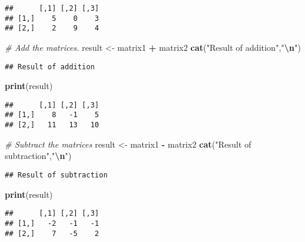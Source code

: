 \documentclass[
]{article}
\newenvironment{Shaded}{\begin{snugshade}}{\end{snugshade}}
\newcommand{\CommentTok}[1]{\textcolor[rgb]{0.56,0.35,0.01}{\textit{#1}}}
\newcommand{\FunctionTok}[1]{\textcolor[rgb]{0.13,0.29,0.53}{\textbf{#1}}}
\newcommand{\NormalTok}[1]{#1}
\newcommand{\OtherTok}[1]{\textcolor[rgb]{0.56,0.35,0.01}{#1}}
\newcommand{\SpecialCharTok}[1]{\textcolor[rgb]{0.81,0.36,0.00}{\textbf{#1}}}
\newcommand{\StringTok}[1]{\textcolor[rgb]{0.31,0.60,0.02}{#1}}
\begin{document}
\begin{verbatim}
##      [,1] [,2] [,3]
## [1,]    5    0    3
## [2,]    2    9    4
\end{verbatim}

\begin{Shaded}
\begin{Highlighting}[]
\CommentTok{\# Add the matrices.}
\NormalTok{result }\OtherTok{\textless{}{-}}\NormalTok{ matrix1 }\SpecialCharTok{+}\NormalTok{ matrix2}
\FunctionTok{cat}\NormalTok{(}\StringTok{"Result of addition"}\NormalTok{,}\StringTok{"}\SpecialCharTok{\textbackslash{}n}\StringTok{"}\NormalTok{)}
\end{Highlighting}
\end{Shaded}

\begin{verbatim}
## Result of addition
\end{verbatim}

\begin{Shaded}
\begin{Highlighting}[]
\FunctionTok{print}\NormalTok{(result)}
\end{Highlighting}
\end{Shaded}

\begin{verbatim}
##      [,1] [,2] [,3]
## [1,]    8   -1    5
## [2,]   11   13   10
\end{verbatim}

\begin{Shaded}
\begin{Highlighting}[]
\CommentTok{\# Subtract the matrices}
\NormalTok{result }\OtherTok{\textless{}{-}}\NormalTok{ matrix1 }\SpecialCharTok{{-}}\NormalTok{ matrix2}
\FunctionTok{cat}\NormalTok{(}\StringTok{"Result of subtraction"}\NormalTok{,}\StringTok{"}\SpecialCharTok{\textbackslash{}n}\StringTok{"}\NormalTok{)}
\end{Highlighting}
\end{Shaded}

\begin{verbatim}
## Result of subtraction
\end{verbatim}

\begin{Shaded}
\begin{Highlighting}[]
\FunctionTok{print}\NormalTok{(result)}
\end{Highlighting}
\end{Shaded}

\begin{verbatim}
##      [,1] [,2] [,3]
## [1,]   -2   -1   -1
## [2,]    7   -5    2
\end{verbatim}
\end{document}
